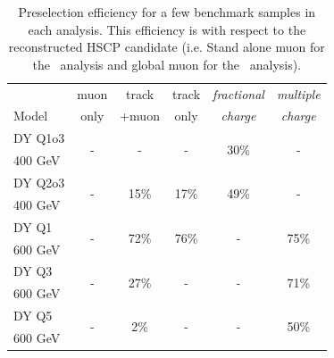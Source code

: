 \begin{table}
 \begin{center}
  \caption{Preselection efficiency for a few benchmark samples in each analysis.
This efficiency is with respect to the reconstructed HSCP candidate (i.e. Stand alone muon for the \tkonly\ analysis and global muon for the \tktof\ analysis).
     \label{tab:preselectionEff}}
   \begin{tabular}{|l|c|c|c|c|c|} \hline
                         & muon           & track        & track        & {\em fractional} & {\em multiple} \\
Model                    & only           & +muon        & only         & {\em charge} & {\em charge}          \\ \hline
DY Q1o3       & \multirow{2}{*}{-}    & \multirow{2}{*}{-}       & \multirow{2}{*}{-}    & \multirow{2}{*}{30\%} & \multirow{2}{*}{-} \\
400 GeV       &                         &                       &                       &                       &                    \\ \hline
DY Q2o3       & \multirow{2}{*}{-}    & \multirow{2}{*}{15\%}    & \multirow{2}{*}{17\%} & \multirow{2}{*}{49\%} & \multirow{2}{*}{-} \\
400 GeV       &                         &                       &                       &                       &                    \\ \hline
DY Q1         & \multirow{2}{*}{-}    & \multirow{2}{*}{72\%}    & \multirow{2}{*}{76\%} & \multirow{2}{*}{-}    & \multirow{2}{*}{75\%} \\
600 GeV       &                         &                       &                       &                       &                       \\ \hline
DY Q3         & \multirow{2}{*}{-}    & \multirow{2}{*}{27\%}    & \multirow{2}{*}{-}    & \multirow{2}{*}{-}    & \multirow{2}{*}{71\%} \\
600 GeV       &                         &                       &                       &                       &                       \\ \hline
DY Q5         & \multirow{2}{*}{-}    & \multirow{2}{*}{ 2\%}    & \multirow{2}{*}{-}    & \multirow{2}{*}{-}    & \multirow{2}{*}{50\%} \\
600 GeV       &                         &                       &                       &                       &                       \\ \hline
   \end{tabular}
 \end{center}
\end{table}


